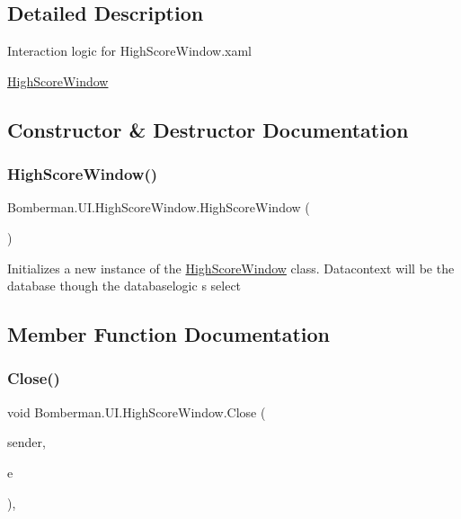 \subsection{Detailed Description}
Interaction logic for High\+Score\+Window.\+xaml 

\mbox{\hyperlink{class_bomberman_1_1_u_i_1_1_high_score_window}{High\+Score\+Window}}

\subsection{Constructor \& Destructor Documentation}
\mbox{\label{class_bomberman_1_1_u_i_1_1_high_score_window_a2fda3721b85ba6cd8013292b54ff5946}} 
\subsubsection{\texorpdfstring{HighScoreWindow()}{HighScoreWindow()}}
{\footnotesize\ttfamily Bomberman.\+U\+I.\+High\+Score\+Window.\+High\+Score\+Window (\begin{DoxyParamCaption}{ }\end{DoxyParamCaption})\hspace{0.3cm}{\ttfamily [inline]}}



Initializes a new instance of the \mbox{\hyperlink{class_bomberman_1_1_u_i_1_1_high_score_window}{High\+Score\+Window}} class. Datacontext will be the database though the databaselogic s select 



\subsection{Member Function Documentation}
\mbox{\label{class_bomberman_1_1_u_i_1_1_high_score_window_a2f8852050224692009bcdb725ec8a774}} 
\subsubsection{\texorpdfstring{Close()}{Close()}}
{\footnotesize\ttfamily void Bomberman.\+U\+I.\+High\+Score\+Window.\+Close (\begin{DoxyParamCaption}\item[{object}]{sender,  }\item[{System.\+Windows.\+Input.\+Key\+Event\+Args}]{e }\end{DoxyParamCaption})\hspace{0.3cm}{\ttfamily [inline]}, {\ttfamily [private]}}



